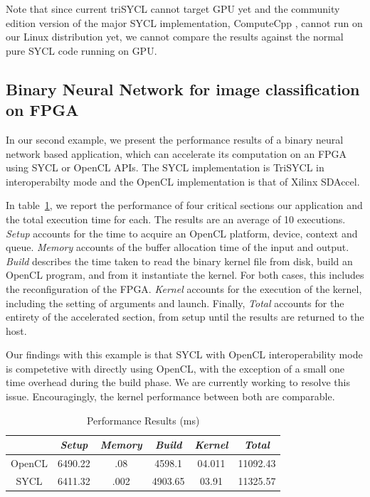 \documentclass[sigplan]{acmart}
\begin{document}
Note that since current triSYCL \cite{triSYCL} cannot target GPU yet
and the community edition version of the major SYCL implementation,
ComputeCpp \cite{ComputeCpp}, cannot run on our Linux distribution yet,
we cannot compare the results against the normal pure SYCL code
running on GPU.


\subsection{Binary Neural Network for image classification on FPGA}
\label{sec:example-from-ken}

In our second example, we present the performance results of a binary neural network based application, which can accelerate its computation on an FPGA using SYCL or OpenCL APIs. The SYCL implementation is TriSYCL in interoperabilty mode and the OpenCL implementation is that of Xilinx SDAccel.

In table~\ref{tbl:perfbnn}, we report the performance of four critical sections our application and the total execution time for each. The results are an average of 10 executions. \textit{Setup} accounts for the time to acquire an OpenCL platform, device, context and queue. \textit{Memory} accounts of the buffer allocation time of the input and output. \textit{Build} describes the time taken to read the binary kernel file from disk, build an OpenCL program, and from it instantiate the kernel. For both cases, this includes the reconfiguration of the FPGA. \textit{Kernel} accounts for the execution of the kernel, including the setting of arguments and launch. Finally, \textit{Total} accounts for the entirety of the accelerated section, from setup until the results are returned to the host.


Our findings with this example is that SYCL with OpenCL interoperability mode is competetive with directly using OpenCL, with the exception of a small one time overhead during the build phase. We are currently working to resolve this issue. Encouragingly, the kernel performance between both are comparable.

\begin{table}
\caption{Performance Results (ms)}
\begin{tabular}{|c |c| c| c| c| c |}
\hline
			&	\textit{Setup}			& \textit{Memory} & \textit{Build}  & \textit{Kernel} & \textit{Total} \\\hline
OpenCL& 6490.22		&		.08& 4598.1	& 04.011 &11092.43 \\\hline
SYCL	& 6411.32	  & .002 & 4903.65	& 03.91	&11325.57 \\\hline
\end{tabular}
\label{tbl:perfbnn}
\end{table}
\end{document}
